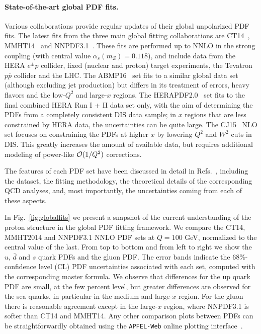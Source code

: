 \paragraph*{State-of-the-art global PDF fits.}
%
Various collaborations provide regular updates of their global unpolarized
PDF fits.
%
The latest fits from the three main global fitting collaborations
are CT14~\cite{Dulat:2015mca}, MMHT14~\cite{Harland-Lang:2014zoa} and
NNPDF3.1~\cite{Ball:2017nwa}.
%
These fits are performed up to NNLO in the strong coupling (with central value
$\alpha_s(m_Z)=0.118$), and include data from the HERA $e^{\pm} p$ collider, 
fixed (nuclear and proton) target experiments, the Tevatron $p\overline{p}$ 
collider and the LHC. 
%
The ABMP16~\cite{Alekhin:2017kpj} set fits to a similar global data set
(although excluding jet production) but differs in its treatment of errors,
 heavy flavors and the low-$Q^2$ and large-$x$ regions.
%
The HERAPDF2.0~\cite{Abramowicz:2015mha} set fits to the final combined HERA 
Run I + II data set only, with the aim of determining the PDFs from a 
completely consistent DIS data sample; in $x$ regions that are less constrained 
by HERA data, the uncertainties can be quite large.
%
The CJ15~\cite{Accardi:2016qay} NLO set focuses on constraining the PDFs at 
higher $x$ by lowering $Q^2$ and $W^2$ cuts in DIS.
%
This greatly increases the amount of available data, but requires additional 
modeling of power-like ${\cal O}(1/Q^2)$ corrections.

The features of each PDF set have been discussed in detail in 
Refs.~\cite{Butterworth:2015oua,Accardi:2016ndt}, including the 
dataset, the fitting methodology, the theoretical details of the 
corresponding QCD analyses, and, most importantly, the uncertainties
coming from each of these aspects.

In Fig.~\ref{fig:globalfits}
we present a snapshot of the current understanding
of the proton structure in the global PDF fitting framework.
%
We compare the CT14, MMHT2014
and NNPDF3.1 NNLO PDF sets at $Q=100$ GeV, normalized
to the central value of the last.
%
From top to bottom and from left to right we show the
$u$, $\bar{d}$ and $s$ quark PDFs and the gluon PDF.
%
The error bands indicate the 68\%-confidence level (CL) PDF uncertainties
associated with each set, computed with the corresponding master formula.
%
We observe that differences for the up quark PDF
are small, at the few percent level, but greater differences
are observed for the sea quarks, in particular
in the medium and large-$x$ region.
%
For the gluon there is reasonable agreement except in the large-$x$ region, 
where NNPDF3.1 is softer than CT14 and MMHT14.
%
Any other comparison plots between PDFs can be straightforwardly
obtained using the {\tt APFEL-Web} online plotting 
interface~\cite{Carrazza:2014gfa}.

